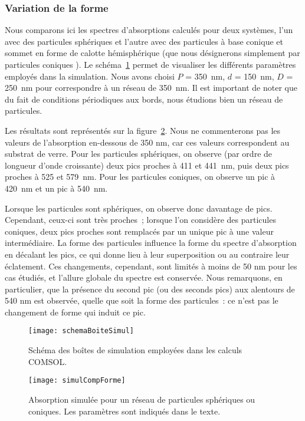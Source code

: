 	\subsubsection{Variation de la forme}
Nous comparons ici les spectres d'absorptions calculés pour deux systèmes, l'un avec des particules sphériques et l'autre avec des particules à base conique et sommet en forme de calotte hémisphérique (que nous désignerons simplement par \og particules coniques \fg). Le schéma~\ref{schemaBoiteSimul} permet de visualiser les différents paramètres employés dans la simulation. Nous avons choisi $P$ = 350~nm, $d$ = 150~nm, $D$ = 250~nm pour correspondre à un réseau de 350~nm. Il est important de noter que du fait de conditions périodiques aux bords, nous étudions bien un réseau de particules.\par 
Les résultats sont représentés sur la figure~\ref{simulCompForme}. Nous ne commenterons pas les valeurs de l'absorption en-dessous de 350 nm, car ces valeurs correspondent au substrat de verre. Pour les particules sphériques, on observe (par ordre de longueur d'onde croissante) deux pics proches à 411 et 441~nm, puis deux pics proches à 525 et 579~nm. Pour les particules coniques, on observe un pic à 420~nm et un pic à 540~nm.\par 
Lorsque les particules sont sphériques, on observe donc davantage de pics. Cependant, ceux-ci sont très proches~; lorsque l'on considère des particules coniques, deux pics proches sont remplacés par un unique pic à une valeur intermédiaire. La forme des particules influence la forme du spectre d'absorption en décalant les pics, ce qui donne lieu à leur superposition ou au contraire leur éclatement. Ces changements, cependant, sont limités à moins de 50 nm pour les cas étudiés, et l'allure globale du spectre est conservée. Nous remarquons, en particulier, que la présence du second pic (ou des seconds pics) aux alentours de 540 nm est observée, quelle que soit la forme des particules~: ce n'est pas le changement de forme qui induit ce pic.\par 
\begin{figure}[!htb]
\centering
\texttt{[image: schemaBoiteSimul]}
\caption{Schéma des boîtes de simulation employées dans les calculs COMSOL.}
\label{schemaBoiteSimul}
\end{figure}
\begin{figure}[!htb]
\centering
\texttt{[image: simulCompForme]}
\caption{Absorption simulée pour un réseau de particules sphériques ou coniques. Les paramètres sont indiqués dans le texte.}
\label{simulCompForme}
\end{figure}
